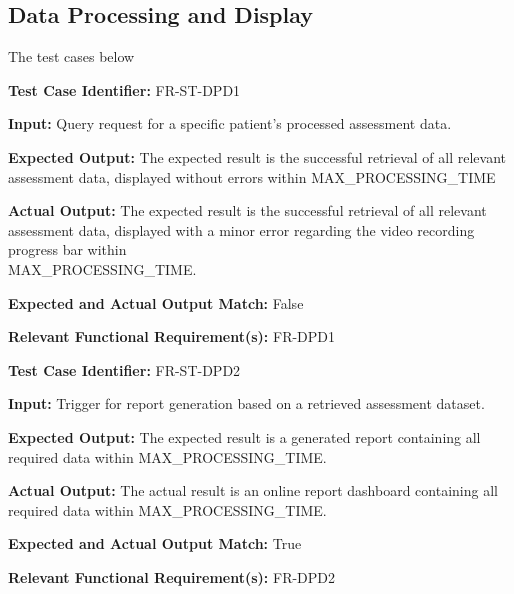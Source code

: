 \documentclass[12pt, titlepage]{article}
\begin{document}
\subsection{Data Processing and Display}
\hspace{2em}The test cases below 

\begin{mdframed}[linewidth=0.5mm] \par
  \textbf{Test Case Identifier:} FR-ST-DPD1 \par
  \textbf{Input:} Query request for a specific patient’s processed assessment data. \par
  \textbf{Expected Output:} The expected result is the successful retrieval of all relevant assessment data, displayed without errors within MAX\_PROCESSING\_TIME \par
  \textbf{Actual Output:} The expected result is the successful retrieval of all relevant assessment data, displayed with a minor error regarding the video recording progress bar within \\MAX\_PROCESSING\_TIME.  \par
  \textbf{Expected and Actual Output Match:} False \par
  \textbf{Relevant Functional Requirement(s):} FR-DPD1
\end{mdframed}

\begin{mdframed}[linewidth=0.5mm] \par
  \textbf{Test Case Identifier:} FR-ST-DPD2 \par
  \textbf{Input:} Trigger for report generation based on a retrieved assessment dataset. \par
  \textbf{Expected Output:} The expected result is a generated report containing all required data within MAX\_PROCESSING\_TIME. \par
  \textbf{Actual Output:} The actual result is an online report dashboard containing all required data within MAX\_PROCESSING\_TIME.  \par
  \textbf{Expected and Actual Output Match:} True \par
  \textbf{Relevant Functional Requirement(s):} FR-DPD2
\end{mdframed}
\end{document}
